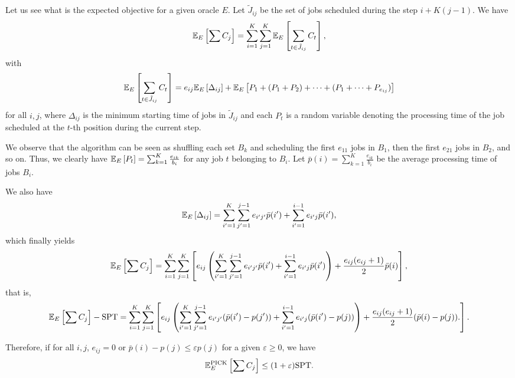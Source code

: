 \documentclass{article}
\begin{document}
Let us see what is the expected objective for a given oracle \(E\).
Let \(\tilde{J}_{ij}\) be the set of jobs scheduled during the step \(i+K(j-1)\).
We have
\[
    \mathbb{E}_E\left[\sum C_j\right]=\sum_{i=1}^K \sum_{j=1}^K \mathbb{E}_E\left[\sum_{t\in \tilde{J}_{ij}} C_t\right],
\]
with
\[
    \mathbb{E}_E\left[\sum_{t\in \tilde{J}_{ij}} C_t\right]=
        e_{ij}\mathbb{E}_E\left[\Delta_{ij}\right]+\mathbb{E}_E\left[P_1+(P_1+P_2)+\dots+(P_1+\dots+P_{e_{ij}})\right]
\]
for all \(i,j\), where \(\Delta_{ij}\) is the minimum starting time of jobs in \(\tilde{J}_{ij}\) and each \(P_t\) is a random variable denoting the processing time of the job scheduled at the \(t\)-th position during the current step.

We observe that the algorithm can be seen as shuffling each set \(B_k\) and scheduling the first \(e_{11}\) jobs in \(B_1\), then the first \(e_{21}\) jobs in \(B_2\), and so on.
Thus, we clearly have \(\mathbb{E}_E\left[P_t\right]=\sum_{k=1}^K \frac{e_{ik}}{b_i}\) for any job \(t\) belonging to \(B_i\).
Let \(\bar{p}(i)=\sum_{k=1}^K \frac{e_{ik}}{b_i}\) be the average processing time of jobs \(B_i\).

We also have
\[
    \mathbb{E}_E\left[\Delta_{ij}\right]=
        \sum_{i'=1}^K \sum_{j'=1}^{j-1} e_{i'j'} \bar{p}(i')
        + \sum_{i'=1}^{i-1} e_{i'j} \bar{p}(i'),
\]
which finally yields
\[
    \mathbb{E}_E\left[\sum C_j\right]=
        \sum_{i=1}^K \sum_{j=1}^K\left[
            e_{ij}\left(\sum_{i'=1}^K \sum_{j'=1}^{j-1} e_{i'j'} \bar{p}(i')
                + \sum_{i'=1}^{i-1} e_{i'j} \bar{p}(i')\right) +
            \frac{e_{ij}(e_{ij}+1)}{2}\bar{p}(i)
        \right],
\]
that is,
\[
    \mathbb{E}_E\left[\sum C_j\right]-\text{SPT}=
        \sum_{i=1}^K \sum_{j=1}^K\left[
            e_{ij}\left(\sum_{i'=1}^K \sum_{j'=1}^{j-1} e_{i'j'} (\bar{p}(i')-p(j'))
                + \sum_{i'=1}^{i-1} e_{i'j} (\bar{p}(i')-p(j))\right) +
            \frac{e_{ij}(e_{ij}+1)}{2}(\bar{p}(i)-p(j)).
        \right].
\]

Therefore, if for all \(i,j\), \(e_{ij}=0\) or \(\bar{p}(i)-p(j)\le\varepsilon p(j)\) for a given \(\varepsilon\ge 0\), we have
\[
    \mathbb{E}^{\text{PICK}}_E\left[\sum C_j\right]\le (1+\varepsilon)\text{SPT}.
\]

\end{document}
